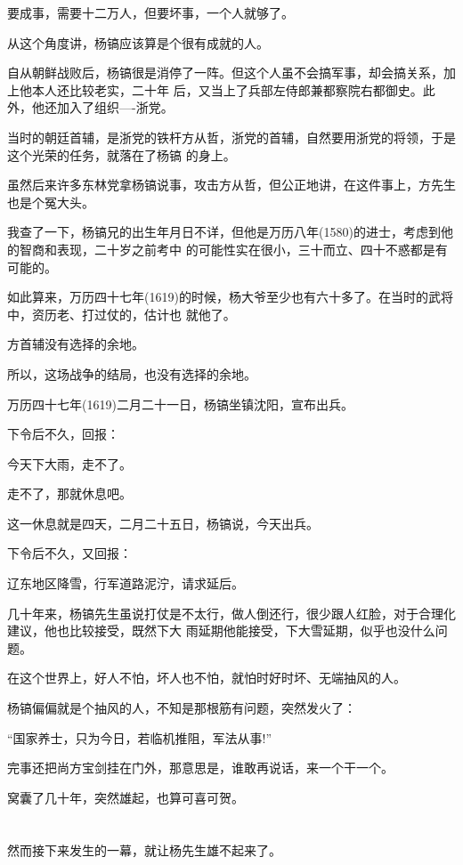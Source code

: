 \documentclass[11pt,a4paper,onecolumn]{article}
\begin{document}
要成事，需要十二万人，但要坏事，一个人就够了。

从这个角度讲，杨镐应该算是个很有成就的人。

自从朝鲜战败后，杨镐很是消停了一阵。但这个人虽不会搞军事，却会搞关系，加上他本人还比较老实，二十年
后，又当上了兵部左侍郎兼都察院右都御史。此外，他还加入了组织----浙党。

当时的朝廷首辅，是浙党的铁杆方从哲，浙党的首辅，自然要用浙党的将领，于是这个光荣的任务，就落在了杨镐
的身上。

虽然后来许多东林党拿杨镐说事，攻击方从哲，但公正地讲，在这件事上，方先生也是个冤大头。

我查了一下，杨镐兄的出生年月日不详，但他是万历八年(1580)的进士，考虑到他的智商和表现，二十岁之前考中
的可能性实在很小，三十而立、四十不惑都是有可能的。

如此算来，万历四十七年(1619)的时候，杨大爷至少也有六十多了。在当时的武将中，资历老、打过仗的，估计也
就他了。

方首辅没有选择的余地。

所以，这场战争的结局，也没有选择的余地。

万历四十七年(1619)二月二十一日，杨镐坐镇沈阳，宣布出兵。

下令后不久，回报：

今天下大雨，走不了。

走不了，那就休息吧。

这一休息就是四天，二月二十五日，杨镐说，今天出兵。

下令后不久，又回报：

辽东地区降雪，行军道路泥泞，请求延后。

几十年来，杨镐先生虽说打仗是不太行，做人倒还行，很少跟人红脸，对于合理化建议，他也比较接受，既然下大
雨延期他能接受，下大雪延期，似乎也没什么问题。

在这个世界上，好人不怕，坏人也不怕，就怕时好时坏、无端抽风的人。

杨镐偏偏就是个抽风的人，不知是那根筋有问题，突然发火了：

``国家养士，只为今日，若临机推阻，军法从事!''

完事还把尚方宝剑挂在门外，那意思是，谁敢再说话，来一个干一个。

窝囊了几十年，突然雄起，也算可喜可贺。

\section[\thesection]{}

然而接下来发生的一幕，就让杨先生雄不起来了。
\end{document}
